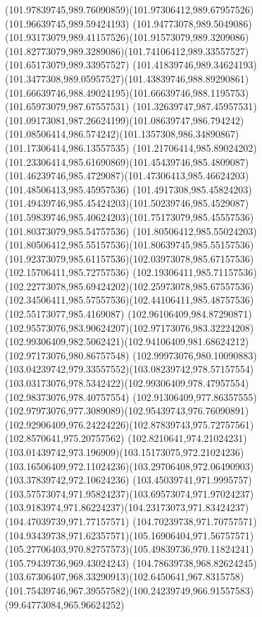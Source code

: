 {{		\curveto(101.97839745,989.76090859)(101.97306412,989.67957526)(101.96639745,989.59424193)
		\curveto(101.94773078,989.5049086)(101.93173079,989.41157526)(101.91573079,989.3209086)
		\curveto(101.82773079,989.3289086)(101.74106412,989.33557527)(101.65173079,989.33957527)
		\curveto(101.41839746,989.34624193)(101.3477308,989.05957527)(101.43839746,988.89290861)
		\curveto(101.66639746,988.49024195)(101.66639746,988.1195753)(101.65973079,987.67557531)
		\curveto(101.32639747,987.45957531)(101.09173081,987.26624199)(101.08639747,986.794242)
		\curveto(101.08506414,986.574242)(101.1357308,986.34890867)(101.17306414,986.13557535)
		\curveto(101.21706414,985.89024202)(101.23306414,985.61690869)(101.45439746,985.4809087)
		\curveto(101.46239746,985.4729087)(101.47306413,985.46624203)(101.48506413,985.45957536)
		\curveto(101.4917308,985.45824203)(101.49439746,985.45424203)(101.50239746,985.4529087)
		\curveto(101.59839746,985.40624203)(101.75173079,985.45557536)(101.80373079,985.54757536)
		\curveto(101.80506412,985.55024203)(101.80506412,985.55157536)(101.80639745,985.55157536)
		\curveto(101.92373079,985.61157536)(102.03973078,985.67157536)(102.15706411,985.72757536)
		\curveto(102.19306411,985.71157536)(102.22773078,985.69424202)(102.25973078,985.67557536)
		\curveto(102.34506411,985.57557536)(102.44106411,985.48757536)(102.55173077,985.4169087)
		\curveto(102.96106409,984.87290871)(102.95573076,983.90624207)(102.97173076,983.32224208)
		\curveto(102.99306409,982.5062421)(102.94106409,981.68624212)(102.97173076,980.86757548)
		\curveto(102.99973076,980.10090883)(103.04239742,979.33557552)(103.08239742,978.57157554)
		\curveto(103.03173076,978.5342422)(102.99306409,978.47957554)(102.98373076,978.40757554)
		\curveto(102.91306409,977.86357555)(102.97973076,977.3089089)(102.95439743,976.76090891)
		\curveto(102.92906409,976.24224226)(102.87839743,975.72757561)(102.8570641,975.20757562)
		\curveto(102.8210641,974.21024231)(103.01439742,973.196909)(103.15173075,972.21024236)
		\curveto(103.16506409,972.11024236)(103.29706408,972.06490903)(103.37839742,972.10624236)
		\curveto(103.45039741,971.9995757)(103.57573074,971.95824237)(103.69573074,971.97024237)
		\curveto(103.9183974,971.86224237)(104.23173073,971.83424237)(104.47039739,971.77157571)
		\curveto(104.70239738,971.70757571)(104.93439738,971.62357571)(105.16906404,971.56757571)
		\curveto(105.27706403,970.82757573)(105.49839736,970.11824241)(105.79439736,969.43024243)
		\curveto(104.78639738,968.82624245)(103.67306407,968.33290913)(102.6450641,967.8315758)
		\curveto(101.75439746,967.39557582)(100.24239749,966.91557583)(99.64773084,965.96624252)
}}
